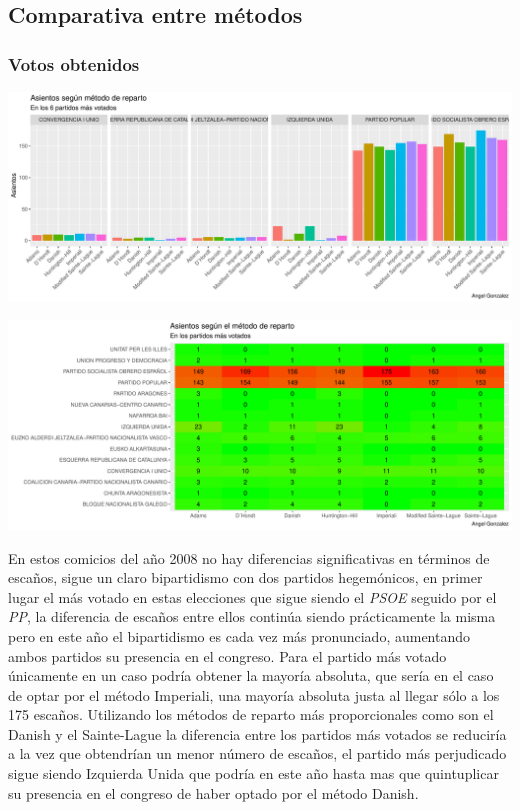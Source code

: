 \documentclass[12pt,a4paper,]{book}
\numberwithin{dummy}{section}
\theoremstyle{ocrenumbox}
\theoremstyle{blacknumex}
\theoremstyle{blacknumbox}
\theoremstyle{ocrenum}
\theoremstyle{ocrenum}
\begin{document}
\hypertarget{comparativa-entre-muxe9todos-9}{%
\subsection{Comparativa entre
métodos}\label{comparativa-entre-muxe9todos-9}}

\hypertarget{votos-obtenidos-9}{%
\subsubsection{Votos obtenidos}\label{votos-obtenidos-9}}

\begin{center}\includegraphics[width=0.95\linewidth]{figurasR/unnamed-chunk-140-1} \end{center}

\begin{center}\includegraphics[width=0.95\linewidth]{figurasR/unnamed-chunk-140-2} \end{center}

En estos comicios del año 2008 no hay diferencias significativas en
términos de escaños, sigue un claro bipartidismo con dos partidos
hegemónicos, en primer lugar el más votado en estas elecciones que sigue
siendo el \emph{PSOE} seguido por el \emph{PP}, la diferencia de escaños
entre ellos continúa siendo prácticamente la misma pero en este año el
bipartidismo es cada vez más pronunciado, aumentando ambos partidos su
presencia en el congreso. Para el partido más votado únicamente en un
caso podría obtener la mayoría absoluta, que sería en el caso de optar
por el método Imperiali, una mayoría absoluta justa al llegar sólo a los
175 escaños. Utilizando los métodos de reparto más proporcionales como
son el Danish y el Sainte-Lague la diferencia entre los partidos más
votados se reduciría a la vez que obtendrían un menor número de escaños,
el partido más perjudicado sigue siendo Izquierda Unida que podría en
este año hasta mas que quintuplicar su presencia en el congreso de haber
optado por el método Danish.
\end{document}
